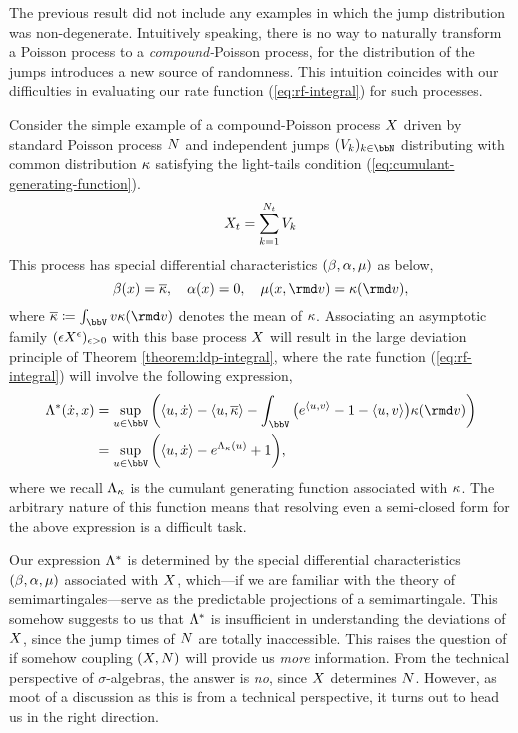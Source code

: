 The previous result did not include any examples in which the jump distribution was non-degenerate.
Intuitively speaking, there is no way to naturally transform a Poisson process to a \emph{compound-}Poisson process, for the distribution of the jumps introduces a new source of randomness.
This intuition coincides with our difficulties in evaluating our rate function (\ref{eq:rf-integral}) for such processes.

Consider the simple example of a compound-Poisson process $X$ driven by standard Poisson process $N$ and independent jumps $(V_k)_{k\in\bbN}$ distributing with common distribution $\kappa$ satisfying the light-tails condition (\ref{eq:cumulant-generating-function}).
\[
  X_t = \sum_{k=1}^{N_t} V_k
\]
This process has special differential characteristics $(\beta, \alpha, \mu)$ as below,
\[
  \affDrift(\stateVar) = \overline\affDist, \quad
  \affDiff(\stateVar) = 0, \quad
  \affJump(\stateVar, \rmd\markVar) = \affDist(\rmd\markVar),
\]
where $\overline\affDist \defeq \int_\vecSpace \markVar \affDist(\rmd\markVar)$ denotes the mean of $\kappa$.
Associating an asymptotic family $(\epsilon X^\epsilon)_{\epsilon>0}$ with this base process $X$ will result in the large deviation principle of Theorem \ref{theorem:ldp-integral}, where the rate function (\ref{eq:rf-integral}) will involve the following expression,
\begin{align*}
  \ode^*(\diffVar, \stateVar) 
  &= \sup_{\momentVar\in\vecSpace} \bigg( \prj{\momentVar}{\diffVar} - \prj{\momentVar}{\overline\affDist} - \int_\vecSpace \big( e^\prj{\momentVar}{\markVar} - 1 - \prj{\momentVar}{\markVar} \big) \affDist(\rmd\markVar) \bigg) \\
  &= \sup_{\momentVar\in\vecSpace} \bigg( \prj{\momentVar}{\diffVar} - e^{\ode_\affDist(\momentVar)} + 1 \bigg),
\end{align*}
where we recall $\Lambda_\kappa$ is the cumulant generating function associated with $\kappa$.
The arbitrary nature of this function means that resolving even a semi-closed form for the above expression is a difficult task.

Our expression $\Lambda^*$ is determined by the special differential characteristics $(\beta, \alpha, \mu)$ associated with $X$, which---if we are familiar with the theory of semimartingales---serve as the predictable projections of a semimartingale.
This somehow suggests to us that $\Lambda^*$ is insufficient in understanding the deviations of $X$, since the jump times of $N$ are totally inaccessible.
This raises the question of if somehow coupling $(X, N)$ will provide us \emph{more} information.
From the technical perspective of $\sigma$-algebras, the answer is \emph{no}, since $X$ determines $N$.
However, as moot of a discussion as this is from a technical perspective, it turns out to head us in the right direction.

